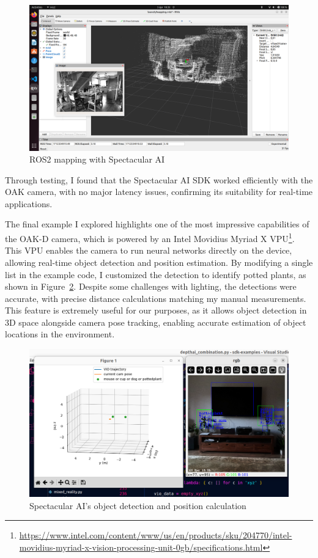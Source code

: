\begin{figure}[htbp]
	\centering
	\includegraphics[width=150mm, keepaspectratio]{figures/spectacular_ai_mapping_ros2.png}
	\caption{ROS2 mapping with Spectacular AI}
	\label{fig:SPAI_ros_mapping}
\end{figure}

Through testing, I found that the Spectacular AI SDK worked efficiently with the OAK camera, with no major latency issues, confirming its suitability for real-time applications.

The final example I explored highlights one of the most impressive capabilities of the OAK-D camera, which is powered by an Intel Movidius Myriad X VPU\footnote{\url{https://www.intel.com/content/www/us/en/products/sku/204770/intel-movidius-myriad-x-vision-processing-unit-0gb/specifications.html}}. This VPU enables the camera to run neural networks directly on the device, allowing real-time object detection and position estimation. By modifying a single list in the example code, I customized the detection to identify potted plants, as shown in Figure~\ref{fig:SPAI_depthai}. Despite some challenges with lighting, the detections were accurate, with precise distance calculations matching my manual measurements. This feature is extremely useful for our purposes, as it allows object detection in 3D space alongside camera pose tracking, enabling accurate estimation of object locations in the environment.

\begin{figure}[htbp]
	\centering
	\includegraphics[width=150mm, keepaspectratio]{figures/spectacular_ai_depthai_combination.png}
	\caption{Spectacular AI's object detection and position calculation}
	\label{fig:SPAI_depthai}
\end{figure}


